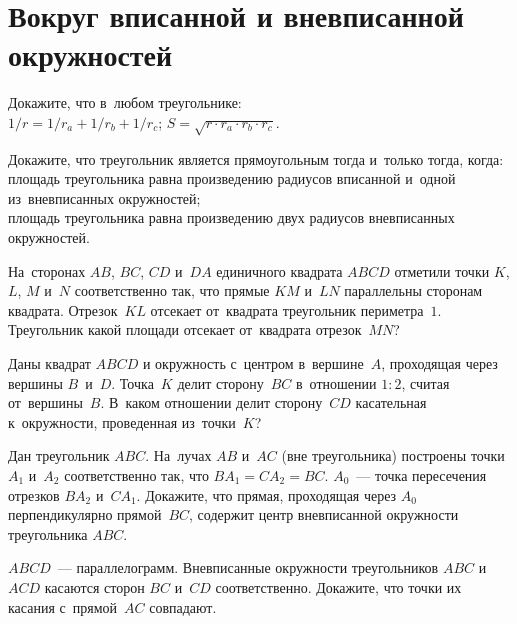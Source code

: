 
\section*{Вокруг вписанной и вневписанной окружностей}


\begin{problems}

\item
Докажите, что в~любом треугольнике:\\
\subproblem
$1 / r = 1 / r_{a} + 1 / r_{b} + 1 / r_{c}$;
\qquad
\subproblem
$S = \sqrt{r \cdot r_{a} \cdot r_{b} \cdot r_{c}}$.

\item
Докажите, что треугольник является прямоугольным тогда и~только тогда, когда:
\\
\subproblem
площадь треугольника равна произведению радиусов вписанной и~одной
из~вневписанных окружностей;
\\
\subproblem
площадь треугольника равна произведению двух радиусов вневписанных окружностей.

\item
На~сторонах $AB$, $BC$, $CD$ и~$DA$ единичного квадрата $ABCD$ отметили точки
$K$, $L$, $M$ и~$N$ соответственно так, что прямые $KM$ и~$LN$ параллельны
сторонам квадрата.
Отрезок~$KL$ отсекает от~квадрата треугольник периметра~$1$.
Треугольник какой площади отсекает от~квадрата отрезок~$MN$?

\item
Даны квадрат $ABCD$ и окружность с~центром в~вершине~$A$, проходящая через
вершины $B$~и~$D$.
Точка~$K$ делит сторону~$BC$ в~отношении $1 : 2$, считая от~вершины~$B$.
В~каком отношении делит сторону~$CD$ касательная к~окружности, проведенная
из~точки~$K$?

\item
Дан треугольник $ABC$.
На~лучах $AB$ и~$AC$ (вне треугольника) построены точки $A_1$ и~$A_2$
соответственно так, что $B A_1 = C A_2 = BC$.
$A_0$~--- точка пересечения отрезков $B A_2$ и~$C A_1$.
Докажите, что прямая, проходящая через $A_0$ перпендикулярно прямой~$BC$,
содержит центр вневписанной окружности треугольника $ABC$.

\item
$ABCD$~--- параллелограмм.
Вневписанные окружности треугольников $ABC$ и~$ACD$ касаются сторон $BC$ и~$CD$
соответственно.
Докажите, что точки их касания с~прямой~$AC$ совпадают.


\end{problems}
